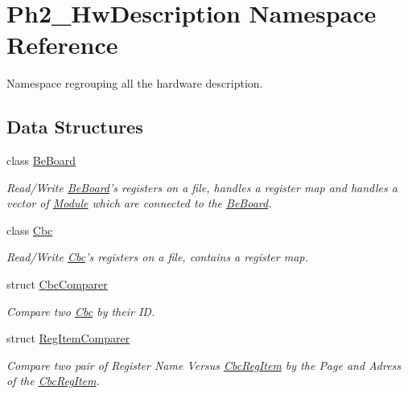 \hypertarget{namespace_ph2___hw_description}{\section{Ph2\-\_\-\-Hw\-Description Namespace Reference}
\label{namespace_ph2___hw_description}
}


Namespace regrouping all the hardware description.  


\subsection*{Data Structures}
\begin{DoxyCompactItemize}
\item 
class \hyperlink{class_ph2___hw_description_1_1_be_board}{Be\-Board}
\begin{DoxyCompactList}\small\item\em Read/\-Write \hyperlink{class_ph2___hw_description_1_1_be_board}{Be\-Board}'s registers on a file, handles a register map and handles a vector of \hyperlink{class_ph2___hw_description_1_1_module}{Module} which are connected to the \hyperlink{class_ph2___hw_description_1_1_be_board}{Be\-Board}. \end{DoxyCompactList}\item 
class \hyperlink{class_ph2___hw_description_1_1_cbc}{Cbc}
\begin{DoxyCompactList}\small\item\em Read/\-Write \hyperlink{class_ph2___hw_description_1_1_cbc}{Cbc}'s registers on a file, contains a register map. \end{DoxyCompactList}\item 
struct \hyperlink{struct_ph2___hw_description_1_1_cbc_comparer}{Cbc\-Comparer}
\begin{DoxyCompactList}\small\item\em Compare two \hyperlink{class_ph2___hw_description_1_1_cbc}{Cbc} by their I\-D. \end{DoxyCompactList}\item 
struct \hyperlink{struct_ph2___hw_description_1_1_reg_item_comparer}{Reg\-Item\-Comparer}
\begin{DoxyCompactList}\small\item\em Compare two pair of Register Name Versus \hyperlink{struct_ph2___hw_description_1_1_cbc_reg_item}{Cbc\-Reg\-Item} by the Page and Adress of the \hyperlink{struct_ph2___hw_description_1_1_cbc_reg_item}{Cbc\-Reg\-Item}. \end{DoxyCompactList}\item 

\end{DoxyCompactItemize}
